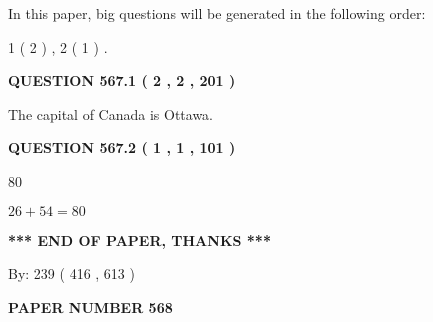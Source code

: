 \documentclass[12pt]{article}
\begin{document}
In this paper, big questions will be generated in the following order: 
   
   
   1 ( 2 )
 ,
   2 ( 1 )
 .
  
\vspace{0.2in}
  
{\textbf{\Large{QUESTION
567.1 
 ( 2 , 2 , 201 )
}}}
  
  
 
 
\noindent{}
 
 
The capital of Canada is Ottawa.
 
 
 
 
  
\vspace{0.2in}
  
{\textbf{\Large{QUESTION
567.2 
 ( 1 , 1 , 101 )
}}}
  
  
 
 
\noindent{}

80
 
 
 
 
\noindent{}

$ %
26 +  %
54=   %
80$
 
 
   
   
 \vspace{0.2in}
 
   
   
   
   
\vspace{1.0in} 
{\textbf{\large{ *** END OF PAPER, THANKS *** }}} 
   
   
\hspace{1.0in} By: 
 239 ( 416 ,  613 )
   
   
   
   
\newpage 
\setcounter{page}{ 
   568001 } 
   
   
   
   
 {\textbf{ \Large{ PAPER NUMBER  568  }}}
   
   
\vspace{0.2in}
   
   
   
   
   
\end{document}
